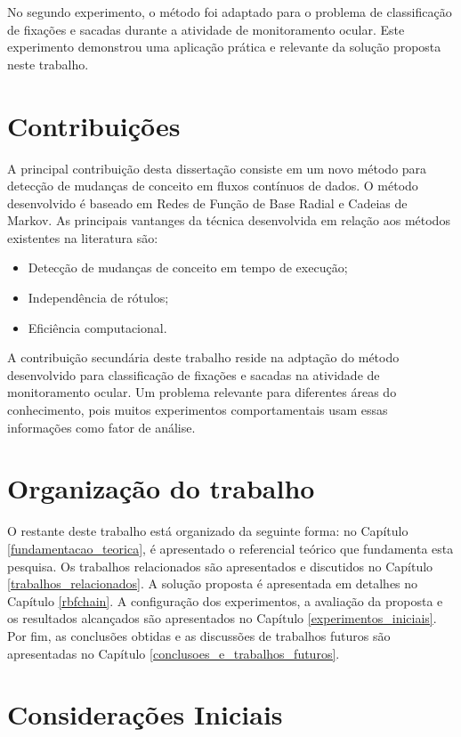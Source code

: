 \documentclass[msc, classic, a4paper]{ufbathesis}
\begin{document}
No segundo experimento,
o método foi adaptado para o problema de classificação de fixações e sacadas durante a atividade de monitoramento ocular.
Este experimento demonstrou uma aplicação prática e relevante da solução proposta neste trabalho.

\section{Contribuições}

A principal contribuição desta dissertação consiste em um novo método para detecção de mudanças de conceito em fluxos contínuos de dados.
O método desenvolvido é baseado em Redes de Função de Base Radial e Cadeias de Markov.
As principais vantanges da técnica desenvolvida em relação aos métodos existentes na literatura são:

\begin{itemize}
    \item Detecção de mudanças de conceito em tempo de execução;
    \item Independência de rótulos;
    \item Eficiência computacional.
\end{itemize}

A contribuição secundária deste trabalho reside na adptação do método desenvolvido para classificação de fixações e sacadas na atividade de monitoramento ocular.
Um problema relevante para diferentes áreas do conhecimento,
pois muitos experimentos comportamentais usam essas informações como fator de análise.

\section{Organização do trabalho}

O restante deste trabalho está organizado da seguinte forma:
%
no Capítulo \ref{fundamentacao_teorica}, é apresentado o referencial teórico que fundamenta esta pesquisa.
Os trabalhos relacionados são apresentados e discutidos no Capítulo \ref{trabalhos_relacionados}.
A solução proposta é apresentada em detalhes no Capítulo \ref{rbfchain}.
A configuração dos experimentos, a avaliação da proposta e os resultados alcançados são apresentados no Capítulo \ref{experimentos_iniciais}.
Por fim, as conclusões obtidas e as discussões de trabalhos futuros são apresentadas no Capítulo \ref{conclusoes_e_trabalhos_futuros}.

 \label{fundamentacao_teorica}
\section{Considerações Iniciais}
\end{document}

